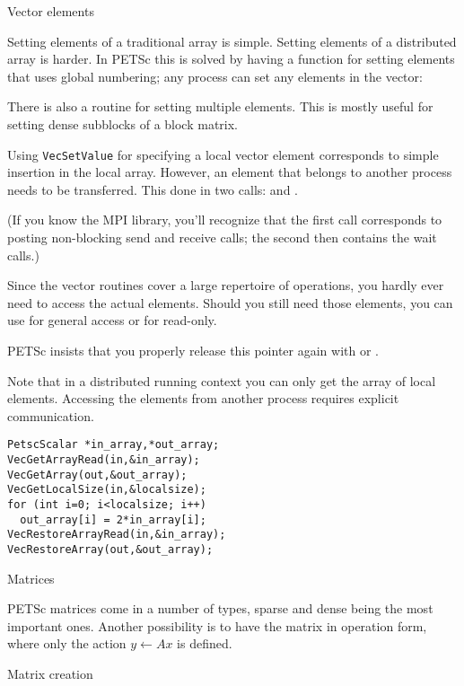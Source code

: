  {Vector elements}

Setting elements of a traditional array is simple. Setting elements of
a distributed array is harder. In PETSc this is solved by having a
function  for setting elements that uses global numbering; any
process can set any elements in the vector:
%

There is also a routine  for setting
multiple elements. This is mostly useful for setting dense subblocks
of a block matrix.

Using \lstinline{VecSetValue} for specifying a local vector element
corresponds to simple insertion in the local array. However,
an element that belongs to another process needs to be
transferred. This done in two calls: 
and .

(If you know the MPI library, you'll recognize that the first call corresponds to
posting non-blocking send and receive calls; the second then contains
the wait calls.)

Since the vector routines cover a large repertoire of operations, you
hardly ever need to access the actual elements. Should you still need
those elements, you can use  for general
access or  for read-only.

PETSc insists that you properly release this pointer again with
 or
.

Note that in a distributed running context you can only get the array
of local elements. Accessing the elements from another process
requires explicit communication.

\begin{lstlisting}
PetscScalar *in_array,*out_array;
VecGetArrayRead(in,&in_array);
VecGetArray(out,&out_array);
VecGetLocalSize(in,&localsize);
for (int i=0; i<localsize; i++)
  out_array[i] = 2*in_array[i];
VecRestoreArrayRead(in,&in_array);
VecRestoreArray(out,&out_array);
\end{lstlisting}

 {Matrices}

PETSc matrices come in a number of types, sparse and dense being the
most important ones. Another possibility is to have the matrix in
operation form, where only the action $y\leftarrow Ax$ is defined.

 {Matrix creation}

